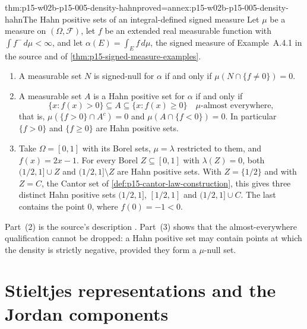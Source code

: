 \begin{hbtheorem}{thm:p15-w02b-p15-005-density-hahn}{proved=annex:p15-w02b-p15-005-density-hahn}{The Hahn positive sets of an integral-defined signed measure}
Let \(\mu\) be a measure on \((\Omega,\mathcal F)\), let \(f\) be an
extended real measurable function with \(\int f^-\,d\mu<\infty\), and
let \(\alpha(E)=\int_Ef\,d\mu\), the signed measure of Example~A.4.1 in
the source and of \cref{thm:p15-signed-measure-examples}.
\begin{enumerate}
\item A measurable set \(N\) is signed-null for \(\alpha\) if and only if
      \(\mu(N\cap\{f\neq0\})=0\).
\item A measurable set \(A\) is a Hahn positive set for \(\alpha\) if
      and only if
      \[
       \{x:f(x)>0\}\subseteq A\subseteq\{x:f(x)\geq0\}
                       \quad\mu\text{-almost everywhere},
      \]
      that is, \(\mu(\{f>0\}\cap A^c)=0\) and
      \(\mu(A\cap\{f<0\})=0\). In particular \(\{f>0\}\) and
      \(\{f\geq0\}\) are Hahn positive sets.
\item Take \(\Omega=[0,1]\) with its Borel sets, \(\mu=\lambda\)
      restricted to them, and \(f(x)=2x-1\). For every Borel
      \(Z\subseteq[0,1]\) with \(\lambda(Z)=0\), both
      \((1/2,1]\cup Z\) and \((1/2,1]\setminus Z\) are Hahn positive
      sets. With \(Z=\{1/2\}\) and with \(Z=C\), the Cantor set of
      \cref{def:p15-cantor-law-construction}, this gives three distinct
      Hahn positive sets \((1/2,1]\), \([1/2,1]\) and
      \((1/2,1]\cup C\). The last contains the point \(0\), where
      \(f(0)=-1<0\).
\end{enumerate}
\end{hbtheorem}

Part~(2) is the source's description
\cite[p.~468]{DurrettPTEAuthor2019}. Part~(3) shows that the
almost-everywhere qualification cannot be dropped: a Hahn positive set
may contain points at which the density is strictly negative, provided
they form a \(\mu\)-null set.

\section{Stieltjes representations and the Jordan components}
\label{sec:p15-w02b-p15-005-stieltjes}

